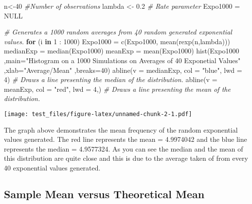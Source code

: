 \documentclass[
]{article}
\newenvironment{Shaded}{\begin{snugshade}}{\end{snugshade}}
\newcommand{\AttributeTok}[1]{\textcolor[rgb]{0.77,0.63,0.00}{#1}}
\newcommand{\CommentTok}[1]{\textcolor[rgb]{0.56,0.35,0.01}{\textit{#1}}}
\newcommand{\ConstantTok}[1]{\textcolor[rgb]{0.00,0.00,0.00}{#1}}
\newcommand{\ControlFlowTok}[1]{\textcolor[rgb]{0.13,0.29,0.53}{\textbf{#1}}}
\newcommand{\DecValTok}[1]{\textcolor[rgb]{0.00,0.00,0.81}{#1}}
\newcommand{\FloatTok}[1]{\textcolor[rgb]{0.00,0.00,0.81}{#1}}
\newcommand{\FunctionTok}[1]{\textcolor[rgb]{0.00,0.00,0.00}{#1}}
\newcommand{\NormalTok}[1]{#1}
\newcommand{\OtherTok}[1]{\textcolor[rgb]{0.56,0.35,0.01}{#1}}
\newcommand{\SpecialCharTok}[1]{\textcolor[rgb]{0.00,0.00,0.00}{#1}}
\newcommand{\StringTok}[1]{\textcolor[rgb]{0.31,0.60,0.02}{#1}}
\begin{document}
\begin{Shaded}
\begin{Highlighting}[]
\NormalTok{n}\OtherTok{\textless{}{-}}\DecValTok{40} \CommentTok{\#Number of observations}
\NormalTok{lambda }\OtherTok{\textless{}{-}} \FloatTok{0.2} \CommentTok{\# Rate parameter}
\NormalTok{Expo1000 }\OtherTok{=} \ConstantTok{NULL}

\CommentTok{\# Generates a 1000 random averages from 40 random generated exponential values.}
\ControlFlowTok{for}\NormalTok{ (i }\ControlFlowTok{in} \DecValTok{1} \SpecialCharTok{:} \DecValTok{1000}\NormalTok{) Expo1000 }\OtherTok{=} \FunctionTok{c}\NormalTok{(Expo1000, }\FunctionTok{mean}\NormalTok{(}\FunctionTok{rexp}\NormalTok{(n,lambda)))}
\NormalTok{medianExp }\OtherTok{=} \FunctionTok{median}\NormalTok{(Expo1000)}
\NormalTok{meanExp }\OtherTok{=} \FunctionTok{mean}\NormalTok{(Expo1000)}
\FunctionTok{hist}\NormalTok{(Expo1000}
\NormalTok{     ,}\AttributeTok{main=}\StringTok{"Histogram on a 1000 Simulations on Averages of 40 Exponetial Values"}
\NormalTok{     ,}\AttributeTok{xlab=}\StringTok{"Average/Mean"}
\NormalTok{     ,}\AttributeTok{breaks=}\DecValTok{40}\NormalTok{)}
\FunctionTok{abline}\NormalTok{(}\AttributeTok{v =}\NormalTok{ medianExp, }\AttributeTok{col =} \StringTok{"blue"}\NormalTok{, }\AttributeTok{lwd =} \DecValTok{4}\NormalTok{) }\CommentTok{\# Draws a line presenting the median of the distribution.}
\FunctionTok{abline}\NormalTok{(}\AttributeTok{v =}\NormalTok{ meanExp, }\AttributeTok{col =} \StringTok{"red"}\NormalTok{, }\AttributeTok{lwd =} \DecValTok{4}\NormalTok{,) }\CommentTok{\# Draws a line presenting the mean of the distribution.}
\end{Highlighting}
\end{Shaded}

\texttt{[image: test\_files/figure-latex/unnamed-chunk-2-1.pdf]}

The graph above demonstrates the mean frequency of the random
exponential values generated. The red line represents the mean =
4.9974042 and the blue line represents the median = 4.9577324. As you
can see the median and the mean of this distribution are quite close and
this is due to the average taken of from every 40 exponential values
generated.

\hypertarget{sample-mean-versus-theoretical-mean}{%
\subsection{Sample Mean versus Theoretical
Mean}\label{sample-mean-versus-theoretical-mean}}
\end{document}
